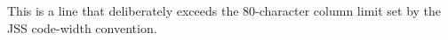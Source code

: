 \documentclass{article}
\begin{document}
This is a line that deliberately exceeds the 80-character column limit set by the JSS code-width convention.
\end{document}
